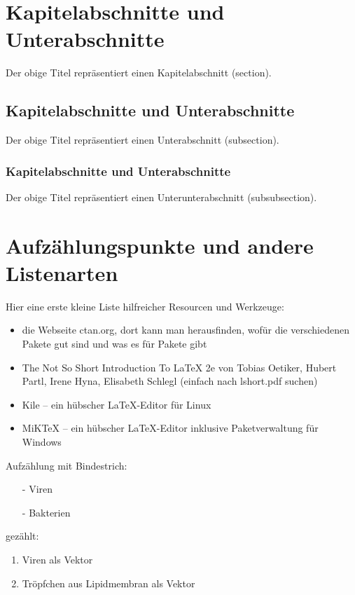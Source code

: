 \documentclass[11pt,a4paper,twoside,titlepage]{book}
\begin{document}
\section{Kapitelabschnitte und Unterabschnitte}

Der obige Titel repräsentiert einen Kapitelabschnitt (section).

\subsection{Kapitelabschnitte und Unterabschnitte}

Der obige Titel repräsentiert einen Unterabschnitt (subsection).

\subsubsection{Kapitelabschnitte und Unterabschnitte}

Der obige Titel repräsentiert einen Unterunterabschnitt (subsubsection).

\section{Aufzählungspunkte und andere Listenarten}

Hier eine erste kleine Liste hilfreicher Resourcen und Werkzeuge:
\begin{itemize}
\item die Webseite ctan.org, dort kann man herausfinden, wofür die verschiedenen Pakete gut sind und was es für Pakete gibt
\item \glqq The Not So Short Introduction To LaTeX 2e\grqq{} von Tobias Oetiker, Hubert Partl, Irene Hyna, Elisabeth Schlegl (einfach nach lshort.pdf suchen)
\item Kile -- ein hübscher LaTeX-Editor für Linux
\item MiKTeX -- ein hübscher LaTeX-Editor inklusive Paketverwaltung für Windows
\end{itemize}

Aufzählung mit Bindestrich:
\begin{itemize}
\item[-] Viren
\item[-] Bakterien
\end{itemize}

gezählt:
\begin{enumerate}
\item Viren als Vektor
\item Tröpfchen aus Lipidmembran als Vektor
\end{enumerate}
\end{document}
